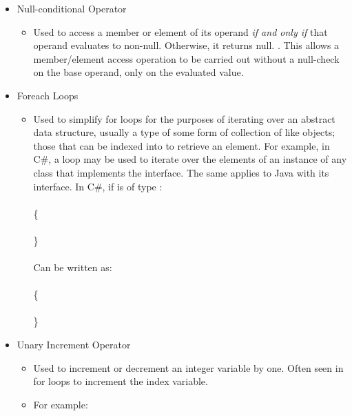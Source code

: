 \documentclass{article}
\begin{document}
\begin{itemize}
        \item Null-conditional Operator
            \begin{itemize}
                \item Used to access a member or element of its operand \emph{if and only if} that operand evaluates to non-null. Otherwise, it returns null. \citep{cs6Spec}. This allows a member/element access operation to be carried out without a null-check on the base operand, only on the evaluated value.
            \end{itemize}
         \item Foreach Loops
            \begin{itemize}
                \item Used to simplify for loops for the purposes of iterating over an abstract data structure, usually a type of some form of collection of like objects; those that can be indexed into to retrieve an element. For example, in C\#, a  loop may be used to iterate over the elements of an instance of any class that implements the  interface. The same applies to Java with its  interface. In C\#, if  is of type :
                \\
                \\
                \{\\
                \hspace*{1cm}\\
                \}
                \\\\
                Can be written as:\\
                \\
                \{\\
                \hspace*{1cm}\\
                \}
            \end{itemize}
        \item Unary Increment Operator
            \begin{itemize}
                \item Used to increment or decrement an integer variable by one. Often seen in for loops to increment the index variable.
                \item For example:\\

\end{itemize}
\end{itemize}
\end{document}
